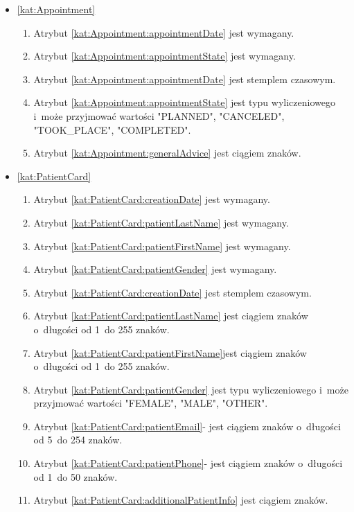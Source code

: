 \begin{itemize}[label={\textbf{Ograniczenia dla}}, wide, labelwidth=!, labelindent=0pt]
    \setlength\itemsep{1.75em}
    \item\ref{kat:Appointment}\mynobreakpar
    \begin{enumerate}[label={\textbf{OGR/5/\protect\twodigits{\arabic{enumi}}}}, wide, labelwidth=!, align=left, leftmargin=3cm]
        \item Atrybut \ref{kat:Appointment:appointmentDate} jest wymagany.
        \item Atrybut \ref{kat:Appointment:appointmentState} jest wymagany.

        \item Atrybut \ref{kat:Appointment:appointmentDate} jest stemplem czasowym.
        \item Atrybut \ref{kat:Appointment:appointmentState} jest typu wyliczeniowego i~może przyjmować wartości "PLANNED", "CANCELED", "TOOK\_PLACE", "COMPLETED".
        \item Atrybut \ref{kat:Appointment:generalAdvice} jest ciągiem znaków.
    \end{enumerate}

    \item\ref{kat:PatientCard}\mynobreakpar
    \begin{enumerate}[label={\textbf{OGR/5/\protect\twodigits{\arabic{enumi}}}}, wide, labelwidth=!, align=left, leftmargin=3cm, resume]
        \item Atrybut \ref{kat:PatientCard:creationDate} jest wymagany.
        \item Atrybut \ref{kat:PatientCard:patientLastName} jest wymagany.
        \item Atrybut \ref{kat:PatientCard:patientFirstName} jest wymagany.
        \item Atrybut \ref{kat:PatientCard:patientGender} jest wymagany.

        \item Atrybut \ref{kat:PatientCard:creationDate} jest stemplem czasowym.
        \item Atrybut \ref{kat:PatientCard:patientLastName} jest ciągiem znaków o~długości od 1~do 255 znaków.
        \item Atrybut \ref{kat:PatientCard:patientFirstName}jest ciągiem znaków o~długości od 1~do 255 znaków.
        \item Atrybut \ref{kat:PatientCard:patientGender} jest typu wyliczeniowego i~może przyjmować wartości "FEMALE", "MALE", "OTHER".
        \item Atrybut \ref{kat:PatientCard:patientEmail}- jest ciągiem znaków o~długości od 5~do 254 znaków.
        \item Atrybut \ref{kat:PatientCard:patientPhone}- jest ciągiem znaków o~długości od 1~do 50 znaków.
        \item Atrybut \ref{kat:PatientCard:additionalPatientInfo} jest ciągiem znaków.
    \end{enumerate}


\end{itemize}
